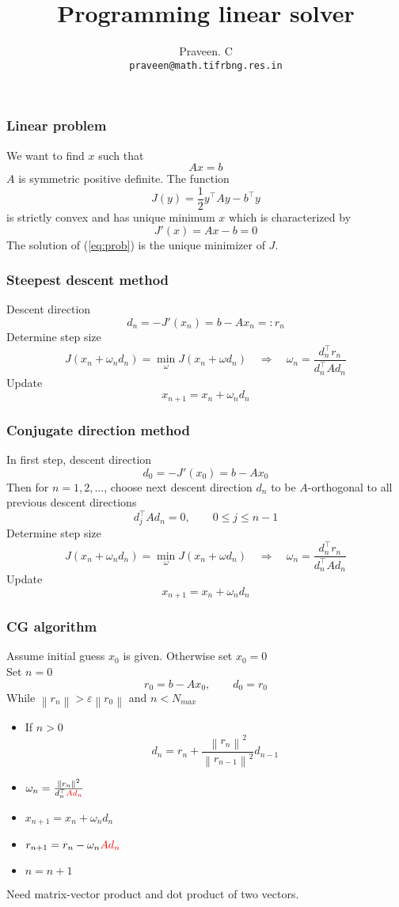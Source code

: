 \documentclass[10pt,xcolor=svgnames]{beamer}
\title[$Ax=b$] %
{Programming linear solver}
\author[Praveen. C] %
{Praveen. C\\
{\tt praveen@math.tifrbng.res.in}}
\institute[TIFR-CAM] %
{
   \texttt{[image: tifr.png]}\\
   Tata Institute of Fundamental Research\\
   Center for Applicable Mathematics\\
   Bangalore 560065\\
{\tt http://math.tifrbng.res.in}
}
\newcommand{\clr}[2]{{\color{#1}#2\color{black}}}
\newcommand{\norm}[1]{\left\| #1 \right\|}
\begin{document}
\begin{frame}
  \titlepage
\end{frame}

\begin{frame}
\frametitle{Linear problem}
We want to find $x$ such that
\begin{equation}
A x = b
\label{eq:prob}
\end{equation}
$A$ is symmetric positive definite. The function
\[
J(y) = \frac{1}{2} y^\top A y - b^\top y
\]
is strictly convex  and has unique minimum $x$ which is characterized by
\[
J'(x) = Ax - b = 0
\]
The solution of (\ref{eq:prob}) is the unique minimizer of $J$.
\end{frame}
\begin{frame}
\frametitle{Steepest descent method}
Descent direction
\[
d_n = -J'(x_n) = b - A x_n =: r_n
\]
Determine step size
\[
J(x_n + \omega_n d_n) = \min_\omega J(x_n + \omega d_n) \quad \Longrightarrow \quad \omega_n = \frac{ d_n^\top r_n }{d_n^\top A d_n}
\]
Update
\[
x_{n+1} = x_n + \omega_n d_n
\]

\end{frame}
\begin{frame}
\frametitle{Conjugate direction method}
In first step, descent direction
\[
d_0 = -J'(x_0) = b - A x_0
\]
Then for $n=1,2,\ldots$, choose next descent direction $d_n$ to be $A$-orthogonal to all previous descent directions
\[
d_j^\top A d_n = 0, \qquad 0 \le j \le n-1
\]
Determine step size
\[
J(x_n + \omega_n d_n) = \min_\omega J(x_n + \omega d_n)  \quad \Longrightarrow \quad \omega_n = \frac{ d_n^\top r_n }{d_n^\top A d_n}
\]
Update
\[
x_{n+1} = x_n + \omega_n d_n
\]

\end{frame}
\begin{frame}
\frametitle{CG algorithm}
Assume initial guess $x_0$ is given. Otherwise set $x_0=0$\\
Set $n=0$ 
\[
r_0 = b - Ax_0, \qquad d_0 = r_0
\]
While $\norm{r_n} > \varepsilon \norm{r_0}$ and $n < N_{max}$
\begin{itemize}
\item If $n > 0$
\[
d_n = r_n + \frac{ \norm{r_n}^2 }{ \norm{r_{n-1}}^2} d_{n-1}
\]
\item $\omega_n = \frac{ \norm{r_n}^2 }{d_n^\top \clr{red}{A d_n}}$
\item $x_{n+1} = x_n + \omega_n d_n$
\item $r_{n+1} = r_n - \omega_n \clr{red}{A d_n}$
\item $n = n + 1$
\end{itemize}
Need matrix-vector product and dot product of two vectors.
\end{frame}
\end{document}
